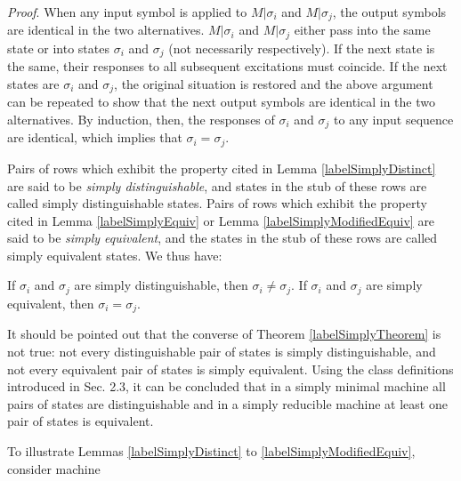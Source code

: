 \documentclass[a4paper]{report}
\begin{document}
    \emph{Proof}. When any input symbol is applied to $M|\sigma_i$ and $M|\sigma_j$, the output symbols are identical in the two alternatives. $M|\sigma_i$ and $M|\sigma_j$ either pass into the same state or into states $\sigma_i$ and $\sigma_j$ (not necessarily respectively). If the next state is the same, their responses to all subsequent excitations must coincide. If the next states are $\sigma_i$ and $\sigma_j$, the original situation is restored and the above argument can be repeated to show that the next output symbols are identical in the two alternatives. By induction, then, the responses of $\sigma_i$ and $\sigma_j$ to any input sequence are identical, which implies that $\sigma_i = \sigma_j$.

    Pairs of rows which exhibit the property cited in Lemma \ref{labelSimplyDistinct} are said to be \emph{simply distinguishable}, and states in the stub of these rows are called simply distinguishable states. Pairs of rows which exhibit the property cited in Lemma \ref{labelSimplyEquiv} or Lemma \ref{labelSimplyModifiedEquiv} are said to be \emph{simply equivalent}, and the states in the stub of these rows are called simply equivalent states.
    We thus have:

    \theorem \label{labelSimplyTheorem} If $\sigma_i$ and $\sigma_j$ are simply distinguishable, then $\sigma_i \neq \sigma_j $. If $\sigma_i$ and $\sigma_j$ are simply equivalent, then $\sigma_i = \sigma_j $.

    It should be pointed out that the converse of Theorem \ref{labelSimplyTheorem} is not true: not every distinguishable pair of states is simply distinguishable, and not every equivalent pair of states is simply equivalent. Using the class definitions introduced in Sec. 2.3, it can be concluded that in a simply minimal machine all pairs of states are distinguishable and in a simply reducible machine at least one pair of states is equivalent.

    To illustrate Lemmas \ref{labelSimplyDistinct} to \ref{labelSimplyModifiedEquiv}, consider machine 
\end{document}
